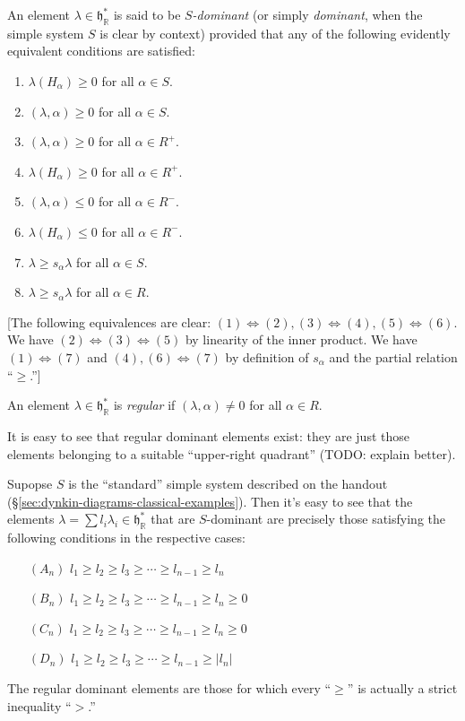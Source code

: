 \documentclass[reqno]{amsart} 
\begin{document}
\begin{definition}\label{defn:dominant}
  An element $\lambda \in \mathfrak{h}_\mathbb{R}^*$ is said to be \emph{$S$-dominant} (or simply \emph{dominant}, when the simple system $S$ is clear by context) provided that any of the following evidently equivalent conditions are satisfied:
  \begin{enumerate}
  \item $\lambda(H_\alpha) \geq 0$ for all $\alpha \in S$.
  \item $(\lambda, \alpha) \geq 0$ for all $\alpha \in S$.
  \item $(\lambda, \alpha) \geq 0$ for all $\alpha \in R^+$.
  \item $\lambda(H_\alpha) \geq 0$ for all $\alpha \in R^+$.
  \item $(\lambda, \alpha) \leq 0$ for all $\alpha \in R^-$.
  \item $\lambda(H_\alpha) \leq 0$ for all $\alpha \in R^-$.
  \item $\lambda \geq s_\alpha \lambda$ for all $\alpha \in S$.
  \item $\lambda \geq s_\alpha \lambda$ for all $\alpha \in R$.
  \end{enumerate}
  [The following equivalences are clear: $(1) \iff (2), (3) \iff (4), (5) \iff (6)$.  We have $(2) \iff (3) \iff (5)$ by linearity of the inner product.  We have $(1) \iff (7)$ and $(4),(6) \iff (7)$ by definition of $s_\alpha$ and the partial relation ``$\geq$.'']
\end{definition}

\begin{definition}
  An element $\lambda \in \mathfrak{h}^*_\mathbb{R}$ is \emph{regular} if $(\lambda,\alpha) \neq 0$ for all $\alpha \in R$.
\end{definition}

It is easy to see that regular dominant elements exist: they are just those elements belonging to a suitable ``upper-right quadrant'' (TODO: explain better).


\begin{example}
  Supopse $S$ is the ``standard'' simple system described on the handout (\S\ref{sec:dynkin-diagrams-classical-examples}).  Then it's easy to see that the elements $\lambda = \sum l_i \lambda_i \in \mathfrak{h}^*_\mathbb{R}$ that are $S$-dominant are precisely those satisfying the following conditions in the respective cases:
  \begin{enumerate}
  \item[$(A_n)$] $l_1 \geq l_2 \geq l_3 \geq \dotsb \geq l_{n-1} \geq l_n$
  \item[$(B_n)$] $l_1 \geq l_2 \geq l_3 \geq \dotsb \geq l_{n-1} \geq l_n \geq 0$
  \item[$(C_n)$] $l_1 \geq l_2 \geq l_3 \geq \dotsb \geq l_{n-1} \geq l_n \geq 0$
  \item[$(D_n)$] $l_1 \geq l_2 \geq l_3 \geq \dotsb \geq l_{n-1} \geq |l_n|$
  \end{enumerate}
  The regular dominant elements are those for which every ``$\geq$'' is actually a strict inequality ``$>$.''
\end{example}
\end{document}

